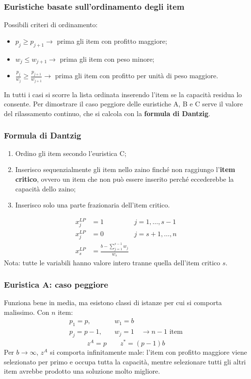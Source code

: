 \subsubsection*{Euristiche basate sull'ordinamento degli item}
Possibili criteri di ordinamento:
\begin{itemize}
	\item[A] $p_j\ge p_{j+1}\rightarrow$ prima gli item con profitto maggiore;
	\item[B] $w_j\le w_{j+1}\rightarrow$ prima gli item con peso minore;
	\item[C] $\frac{p_j}{w_j}\ge \frac{p_{j+1}}{w_{j+1}}\rightarrow$ prima gli item con profitto per unità di peso maggiore.
\end{itemize}
In tutti i casi si scorre la lista ordinata inserendo l'item se la capacità residua lo consente. Per dimostrare il caso peggiore delle euristiche A, B e C serve il valore del rilassamento continuo, che si calcola con la \textbf{formula di Dantzig}.

\subsubsection*{Formula di Dantzig}
\begin{enumerate}
	\item Ordino gli item secondo l'euristica C;
	\item Inserisco sequenzialmente gli item nello zaino finché non raggiungo l'\textbf{item critico}, ovvero un item che non può essere inserito perché eccederebbe la capacità dello zaino;
	\item Inserisco solo una parte frazionaria dell'item critico.
\end{enumerate}
\begin{equation*}
	\begin{aligned}
		x_j^{LP} & =1 \quad & j=1,\dots,s-1\\
		x_j^{LP} & =0 \quad & j=s+1,\dots,n\\
		x_s^{LP} & =\frac{b-\sum_{j=1}^{s-1}w_j}{w_s} &
	\end{aligned}
\end{equation*}
Nota: tutte le variabili hanno valore intero tranne quella dell'item critico $s$.

\subsubsection*{Euristica A: caso peggiore}
Funziona bene in media, ma esistono classi di istanze per cui si comporta malissimo. Con $n$ item:
\begin{equation*}
	\begin{aligned}
		p_1=p, \quad & w_1=b\\
		p_j=p-1, \quad & w_j=1\quad \rightarrow n-1 \textrm{ item}
	\end{aligned}
\end{equation*}
\begin{equation*}
	z^A=p\qquad z^*=(p-1)b
\end{equation*}
Per $b\to \infty$, $z^A$ si comporta infinitamente male: l'item con profitto maggiore viene selezionato per primo e occupa tutta la capacità, mentre selezionare tutti gli altri item avrebbe prodotto una soluzione molto migliore.

